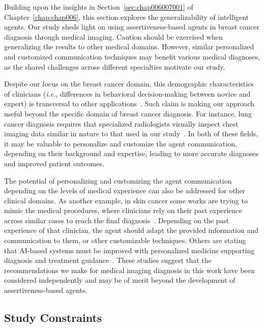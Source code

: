 Building upon the insights in Section~\ref{sec:chap006007001} of Chapter~\ref{chap:chap006}, this section explores the generalizability of intelligent agents.
Our study sheds light on using assertiveness-based agents in breast cancer diagnosis through medical imaging.
Caution should be exercised when generalizing the results to other medical domains.
However, similar personalized and customized communication techniques may benefit various medical diagnoses, as the shared challenges across different specialties motivate our study.

Despite our focus on the breast cancer domain, this demographic characteristics of clinicians ({\it i.e.}, differences in behavioral decision-making between novice and expert) is transversal to other applications~\cite{STAHNKE2021103243, LANDRO2020102897, doi:10.1080/21642850.2020.1741372}.
Such claim is making our approach useful beyond the specific domain of breast cancer diagnosis.
For instance, lung cancer diagnosis requires that specialized radiologists visually inspect chest imaging data similar in nature to that used in our study~\cite{10.1145/3313831.3376807}.
In both of these fields, it may be valuable to personalize and customize the agent communication, depending on their background and expertise, leading to more accurate diagnoses and improved patient outcomes.

The potential of personalizing and customizing the agent communication depending on the levels of medical experience can also be addressed for other clinical domains.
As another example, in skin cancer some works are trying to mimic the medical procedures, where clinicians rely on their past experience across similar cases to reach the final diagnosis~\cite{10.1007/978-3-030-87199-4_52, Tschandl2020, Esteva2017}.
Depending on the past experience of that clinician, the agent should adapt the provided information and communication to them, or other customizable techniques.
Others are stating that AI-based systems must be improved with personalized medicine supporting diagnosis and treatment guidance~\cite{Sollini2020, Aerts2016}.
These studies suggest that the recommendations we make for medical imaging diagnosis in this work have been considered independently and may be of merit beyond the development of assertiveness-based agents.

\subsection{Study Constraints}
\label{sec:app005008002}


